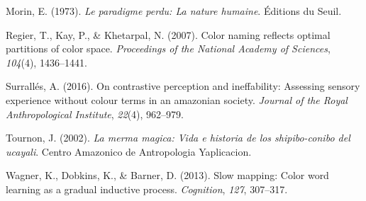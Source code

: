 \documentclass[
  english,
  ,man,floatsintext]{apa6}
\begin{document}
\leavevmode\hypertarget{ref-morin1973}{}%
Morin, E. (1973). \emph{Le paradigme perdu: La nature humaine}. Éditions du Seuil.

\leavevmode\hypertarget{ref-regier2007}{}%
Regier, T., Kay, P., \& Khetarpal, N. (2007). Color naming reflects optimal partitions of color space. \emph{Proceedings of the National Academy of Sciences}, \emph{104}(4), 1436--1441.

\leavevmode\hypertarget{ref-surralles2016}{}%
Surrallés, A. (2016). On contrastive perception and ineffability: Assessing sensory experience without colour terms in an amazonian society. \emph{Journal of the Royal Anthropological Institute}, \emph{22}(4), 962--979.

\leavevmode\hypertarget{ref-tournon2002}{}%
Tournon, J. (2002). \emph{La merma magica: Vida e historia de los shipibo-conibo del ucayali}. Centro Amazonico de Antropologia Yaplicacion.

\leavevmode\hypertarget{ref-wagner2013}{}%
Wagner, K., Dobkins, K., \& Barner, D. (2013). Slow mapping: Color word learning as a gradual inductive process. \emph{Cognition}, \emph{127}, 307--317.

\endgroup
\end{document}
